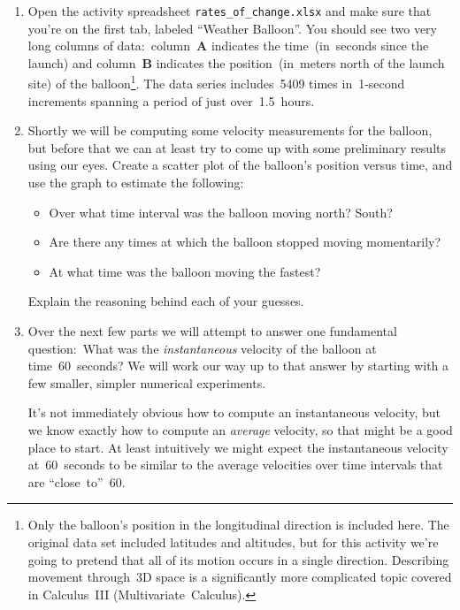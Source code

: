 \begin{enumerate}
	\item Open the activity spreadsheet \verb|rates_of_change.xlsx| and make sure that you're on the first tab, labeled ``Weather Balloon''. You should see two very long columns of data:~column~\textbf{A} indicates the time~(in~seconds since the launch) and column~\textbf{B} indicates the position~(in~meters north of the launch site) of the balloon\footnote{Only the balloon's position in the longitudinal direction is included here. The original data set included latitudes and altitudes, but for this activity we're going to pretend that all of its motion occurs in a single direction. Describing movement through~3D space is a significantly more complicated topic covered in Calculus~III (Multivariate~Calculus).}. The data series includes~5409 times in~1-second increments spanning a period of just over~1.5~hours.
	
	\item Shortly we will be computing some velocity measurements for the balloon, but before that we can at least try to come up with some preliminary results using our eyes. Create a scatter plot of the balloon's position versus time, and use the graph to estimate the following:
	\begin{itemize}
		\item Over what time interval was the balloon moving north? South?
		\item Are there any times at which the balloon stopped moving momentarily?
		\item At what time was the balloon moving the fastest?
	\end{itemize}
	
	Explain the reasoning behind each of your guesses.
	
	\item Over the next few parts we will attempt to answer one fundamental question:~What was the \textit{instantaneous} velocity of the balloon at time~60~seconds? We will work our way up to that answer by starting with a few smaller, simpler numerical experiments.
	
	It's not immediately obvious how to compute an instantaneous velocity, but we know exactly how to compute an \textit{average} velocity, so that might be a good place to start. At least intuitively we might expect the instantaneous velocity at~60~seconds to be similar to the average velocities over time intervals that are ``close~to''~60.
	

\end{enumerate}
